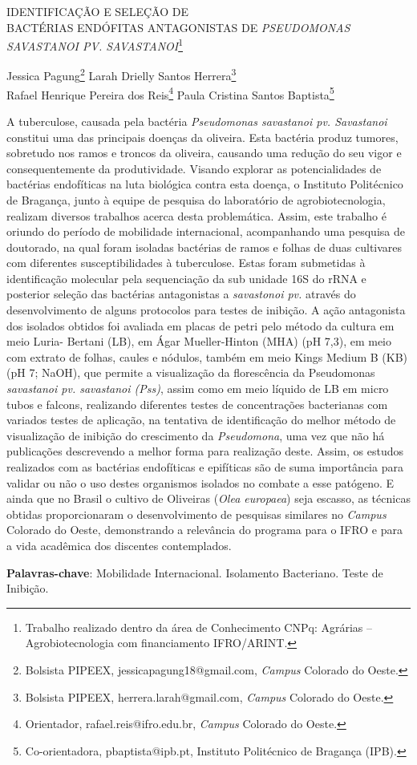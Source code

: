 \documentclass[article,12pt,onesidea,4paper,english,brazil]{abntex2}
\begin{document}
	
	
	\frenchspacing 
	
	\begin{center}
		\LARGE IDENTIFICAÇÃO E SELEÇÃO DE \\BACTÉRIAS ENDÓFITAS ANTAGONISTAS DE \textit{PSEUDOMONAS SAVASTANOI PV. SAVASTANOI}\footnote{Trabalho realizado dentro da área de Conhecimento CNPq: Agrárias – Agrobiotecnologia com financiamento IFRO/ARINT.}
		
		\normalsize
		Jessica Pagung\footnote{Bolsista PIPEEX, jessicapagung18@gmail.com, \textit{Campus} Colorado do Oeste.} 
		Larah Drielly Santos Herrera\footnote{Bolsista PIPEEX, herrera.larah@gmail.com, \textit{Campus} Colorado do Oeste.} \\
		Rafael Henrique Pereira dos Reis\footnote{Orientador, rafael.reis@ifro.edu.br, \textit{Campus} Colorado do Oeste.} 
		Paula Cristina Santos Baptista\footnote{Co-orientadora, pbaptista@ipb.pt, Instituto Politécnico de Bragança (IPB).} 
	\end{center}
	
	\noindent A tuberculose, causada pela bactéria \textit{Pseudomonas savastanoi pv. Savastanoi}	constitui uma das principais doenças da oliveira. Esta bactéria produz tumores,	sobretudo nos ramos e troncos da oliveira, causando uma redução do seu vigor e	consequentemente da produtividade. 
	Visando explorar as potencialidades de bactérias endofíticas na luta biológica contra esta doença, o Instituto Politécnico de
	Bragança, junto à equipe de pesquisa do laboratório de agrobiotecnologia, realizam
	diversos trabalhos acerca desta problemática. Assim, este trabalho é oriundo do
	período de mobilidade internacional, acompanhando uma pesquisa de doutorado, na
	qual foram isoladas bactérias de ramos e folhas de duas cultivares com diferentes
	susceptibilidades à tuberculose. Estas foram submetidas à identificação molecular
	pela sequenciação da sub unidade 16S do rRNA e posterior seleção das bactérias
	antagonistas a \textit{savastonoi pv.} através do desenvolvimento de alguns protocolos para	testes de inibição. A ação antagonista dos isolados obtidos foi avaliada em placas de
	petri pelo método da cultura em meio Luria- Bertani (LB), em Ágar Mueller-Hinton
	(MHA) (pH 7,3), em meio com extrato de folhas, caules e nódulos, também em meio
	Kings Medium B (KB) (pH 7; NaOH), que permite a visualização da florescência da
	Pseudomonas \textit{savastanoi pv. savastanoi (Pss)}, assim como em meio líquido de LB
	em micro tubos e falcons, realizando diferentes testes de concentrações bacterianas
	com variados testes de aplicação, na tentativa de identificação do melhor método de
	visualização de inibição do crescimento da \textit{Pseudomona}, uma vez que não há
	publicações descrevendo a melhor forma para realização deste. Assim, os estudos
	realizados com as bactérias endofíticas e epifíticas são de suma importância para
	validar ou não o uso destes organismos isolados no combate a esse patógeno. E
	ainda que no Brasil o cultivo de Oliveiras (\textit{Olea europaea}) seja escasso, as técnicas
	obtidas proporcionaram o desenvolvimento de pesquisas similares no \textit{Campus}
	Colorado do Oeste, demonstrando a relevância do programa para o IFRO e para a
	vida acadêmica dos discentes contemplados.
	
	\vspace{\onelineskip}
	
	\noindent
	\textbf{Palavras-chave}: Mobilidade Internacional. Isolamento Bacteriano. Teste de Inibição.
	
\end{document}
